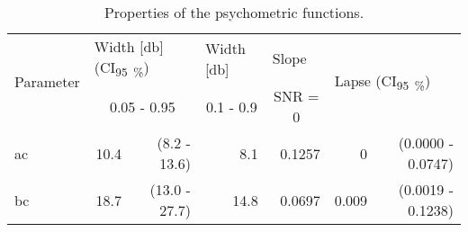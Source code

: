 \begin{table}[H]
\caption{Properties of the psychometric functions.}
\label{tab:psych}
\centering
\begin{tabular}{l|rrrrlr}
\multirow{2}{*}{Parameter} & \multicolumn{2}{l}{Width [\si{\decibel}] (CI\textsubscript{\SI{95}{\percent}})} & \multicolumn{1}{l}{Width [\si{\decibel}]} & \multicolumn{1}{l}{Slope}   & \multicolumn{2}{l}{\multirow{2}{*}{Lapse (CI\textsubscript{\SI{95}{\percent}})}} \\
                           & \multicolumn{2}{c}{0.05 - 0.95}                                                 & \multicolumn{1}{c}{0.1 - 0.9}             & \multicolumn{1}{c}{SNR = 0} & \multicolumn{2}{l}{}                                                             \\ \hline
\gls{ac}         & 10.4                               & (8.2 - 13.6)                                & 8.1                                       & 0.1257                      & \multicolumn{1}{r}{0}                       & (0.0000 - 0.0747)                  \\
\gls{bc}         & 18.7                               & (13.0 - 27.7)                               & 14.8                                      & 0.0697                      & \multicolumn{1}{r}{0.009}                   & (0.0019 - 0.1238)                 
\end{tabular}
\end{table}


